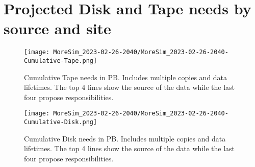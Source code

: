 \section{Projected Disk and Tape needs by source and site}
\begin{figure}[h]
\centering\texttt{[image: MoreSim\_2023-02-26-2040/MoreSim\_2023-02-26-2040-Cumulative-Tape.png]}
\caption{Cumulative Tape needs in PB. Includes multiple copies and data lifetimes. The top 4 lines show the source of the data while the last four propose responsibilities.}
\label{fig:Cumulative-Tape}
\end{figure}
\begin{figure}[h]
\centering\texttt{[image: MoreSim\_2023-02-26-2040/MoreSim\_2023-02-26-2040-Cumulative-Disk.png]}
\caption{Cumulative Disk needs in PB. Includes multiple copies and data lifetimes. The top 4 lines show the source of the data while the last four propose responsibilities.}
\label{fig:Cumulative-Disk}
\end{figure}
